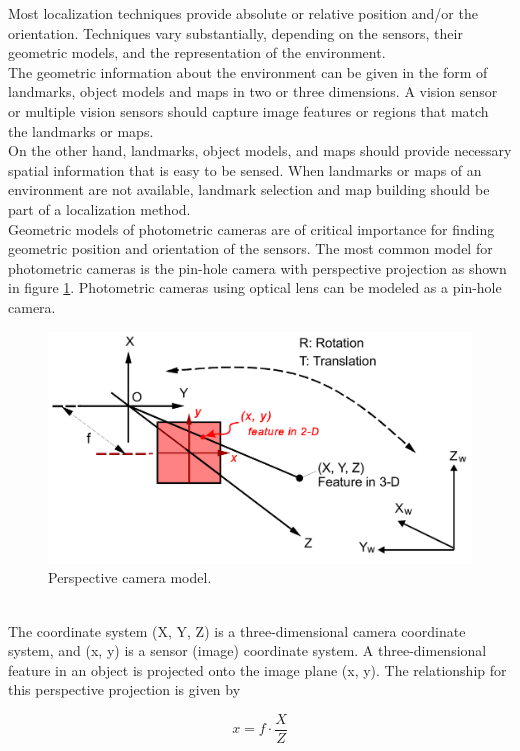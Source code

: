 Most localization techniques provide absolute or relative position and/or
the orientation. Techniques vary substantially, depending on the sensors,
their geometric models, and the representation of the environment.
\\
The geometric information about the environment can be given in the form
of landmarks, object models and maps in two or three dimensions. A vision
sensor or multiple vision sensors should capture image features or regions
that match the landmarks or maps.
\\
On the other hand, landmarks, object models, and maps should provide necessary
spatial information that is easy to be sensed. When landmarks or maps of an
environment are not available, landmark selection and map building should
be part of a localization method.
\\
Geometric models of photometric cameras are of critical importance for
finding geometric position and orientation of the sensors. The most common
model for photometric cameras is the pin-hole camera with perspective projection
as shown in figure \ref{fig:camera_system}. Photometric cameras using optical lens can
be modeled as a pin-hole camera.
\begin{figure} [h]
  \begin{center}
    \includegraphics[width=350pt]{img/camera_system.png}
    \caption{Perspective camera model.}
    \label{fig:camera_system}
  \end{center}
\end{figure}
\\
The coordinate system (X, Y, Z) is a three-dimensional camera coordinate
system, and (x, y) is a sensor (image) coordinate system. A three-dimensional
feature in an object is projected onto the image plane (x, y). The relationship
for this perspective projection is given by

\[
x = f \cdot \frac{X}{Z}
\]


